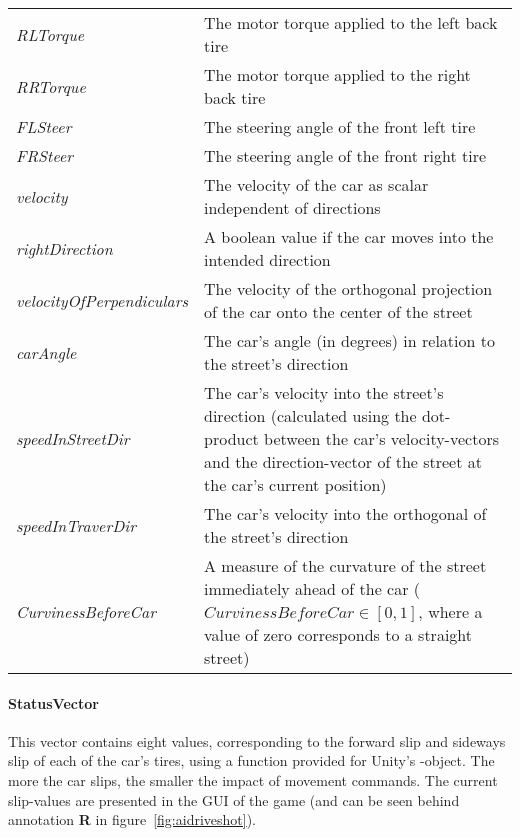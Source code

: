 \renewcommand{\arraystretch}{1.3}
\begin{flushleft}
	\begin{tabular}{>{\em}p{2.9cm} p{\textwidth-3.8cm}} 
		RLTorque & The motor torque applied to the left back tire\\
		RRTorque & The motor torque applied to the right back tire\\
		FLSteer & The steering angle of the front left tire\\
		FRSteer & The steering angle of the front right tire\\
		velocity & The velocity of the car as scalar independent of directions\\
		rightDirection & A boolean value if the car moves into the intended direction\\
		velocityOfPerpendiculars & \hspace*{0.8cm} The velocity of the orthogonal projection of the car onto the center of the street\\ %
		carAngle & The car's angle (in degrees) in relation to the street's direction\\
		speedInStreetDir & The car's velocity into the street's direction (calculated using the dot-product between the car's velocity-vectors and the direction-vector of the street at the car's current position)\\
		speedInTraverDir &  The car's velocity into the orthogonal of the street's direction\\
		CurvinessBeforeCar & A measure of the curvature of the street immediately ahead of the car ($CurvinessBeforeCar \in [0,1]$, where a value of zero corresponds to a straight street)\\	
	\end{tabular}
\end{flushleft}

\paragraph{StatusVector} This vector contains eight values, corresponding to the forward slip and sideways slip of each of the car's tires, using a function provided for Unity's -object. The more the car slips, the smaller the impact of movement commands. The current slip-values are presented in the GUI of the game (and can be seen behind annotation \textbf{R} in figure~\ref{fig:aidriveshot}).

